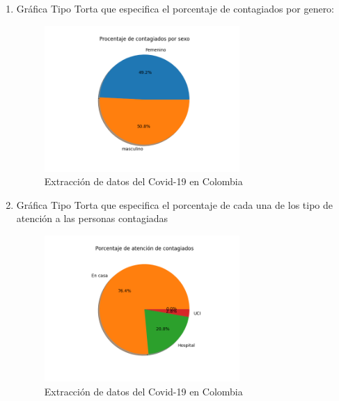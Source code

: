 \documentclass[conference,compsoc,onecolumn]{IEEEtran}
\begin{document}
\begin{enumerate}
     \singlespacing
     \newpage
        \item Gráfica Tipo Torta que especifica el porcentaje de contagiados por genero:
                    \begin{figure}[H]
            \centering
            \includegraphics[width=0.7\textwidth]{Figures/ContagiosGenero.png}
            \caption{Extracción de datos del Covid-19 en Colombia}
            \label{fig:grafica.png}
        \end{figure}
        
     \singlespacing
    \item Gráfica Tipo Torta que especifica el porcentaje de cada una de los tipo de atención a las personas contagiadas
    
    
                \begin{figure}[H]
            \centering
            \includegraphics[width=0.7\textwidth]{Figures/atencionContagiados.png}
            \caption{Extracción de datos del Covid-19 en Colombia}
            \label{fig:grafica.png}
        \end{figure}
    
     \singlespacing
 \end{enumerate}
\end{document}
